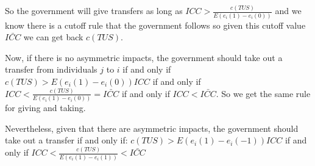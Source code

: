 \documentclass[12pt]{article}
\begin{document}
So the government will give transfers as long as $ICC>\frac{c(TUS)}{E(e_i(1)-e_i(0))}$ and we know there is a cutoff rule that the government follows so given this cutoff value $\bar{ICC}$ we can get back $c(TUS)$.

Now, if there is no asymmetric impacts, the government should take out a transfer from individuals $j$ to $i$ if and only if $c(TUS)>E(e_i(1)-e_i(0))ICC$ if and only if $ICC<\frac{c(TUS)}{E(e_i(1)-e_i(0))}=\bar{ICC}$ if and only if $ICC<\bar{ICC}$. So we get the same rule for giving and taking.

Nevertheless, given that there are asymmetric impacts, the government should take out a transfer if and only if: $c(TUS)>E(e_i(1)-e_i(-1))ICC$ if and only if $ICC<\frac{c(TUS)}{E(e_i(1)-e_i(1))}<\bar{ICC}$




\end{document}
